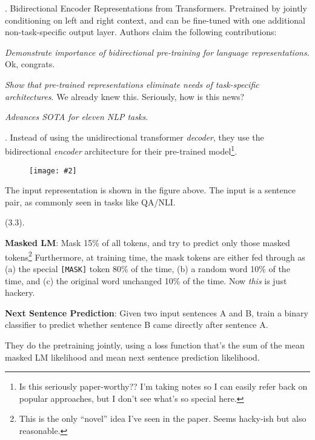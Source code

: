 \documentclass[11pt]{article}
\newcommand\myfig[2][0.3\textwidth]{\begin{figure}[h!]\centering\texttt{[image: \#2]}\end{figure}}
\newcommand\myspace[1][]{\vspace{#1\bigskipamount}}
\newcommand\p{\Needspace{10\baselineskip} \noindent}
\begin{document}
\p {}. Bidirectional Encoder Representations from Transformers. Pretrained by jointly conditioning on left and right context, and can be fine-tuned with one additional non-task-specific output layer. Authors claim the following contributions:
\begin{compactitem}
	\item \textit{Demonstrate importance of bidirectional pre-training for language representations}. Ok, congrats. 
	
	\item \textit{Show that pre-trained representations eliminate needs of task-specific architectures}. We already knew this. Seriously, how is this news?
	
	\item \textit{Advances SOTA for eleven NLP tasks}. 
\end{compactitem}

\myspace 
\p {}. Instead of using the unidirectional transformer \textit{decoder}, they use the bidirectional \textit{encoder} architecture for their pre-trained model\footnote{Is this seriously paper-worthy?? I'm taking notes so I can easily refer back on popular approaches, but I don't see what's so special here.}. 
\myfig[0.7\textwidth]{figs/bert_input.png}

The input representation is shown in the figure above. The input is a sentence pair, as commonly seen in tasks like QA/NLI. 

\myspace
\p {} (3.3). 
\begin{compactenum}
	\item \textbf{Masked LM}: Mask 15\% of all tokens, and try to predict only those masked tokens\footnote{This is the only ``novel'' idea I've seen in the paper. Seems hacky-ish but also reasonable.} Furthermore, at training time, the mask tokens are either fed through as (a) the special \texttt{[MASK]} token 80\% of the time, (b) a random word 10\% of the time, and (c) the original word unchanged 10\% of the time. Now \textit{this} is just hackery. 
	
	\item \textbf{Next Sentence Prediction}: Given two input sentences A and B, train a binary classifier to predict whether sentence B came directly after sentence A. 
\end{compactenum}
They do the pretraining jointly, using a loss function that's the sum of the mean masked LM likelihood and mean next sentence prediction likelihood. 
\end{document}
